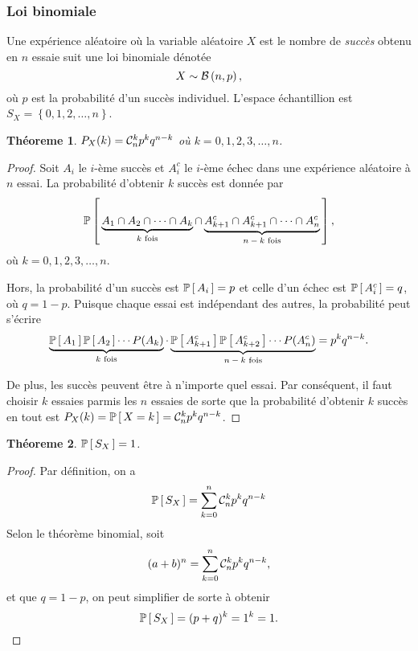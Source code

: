 \documentclass[11pt]{article}
\newcommand\comb[2]{%
	\ensuremath{%
		\mathcal{C}_{#2}^{#1}%
	}%
}%
\renewcommand\P[1]{%
	\ensuremath{%
		\mathbb{P}\left[\,#1\,\right]%
	}%
}%
\newcommand\Bin[2]{%
	\ensuremath{%
		\mathcal{B}\left(#1,#2\right)%
	}%
}%
\newtheorem{theoreme}{Théoreme}[section]
\begin{document}
\subsubsection{Loi binomiale}
Une expérience aléatoire où la variable aléatoire $X$ est le nombre de
\textit{succès} obtenu en $n$ essaie suit une loi binomiale dénotée
\begin{equation*}
	X\sim\Bin{n}{p},
\end{equation*}
où $p$ est la probabilité d'un succès individuel. L'espace échantillion est
$S_X=\left\{0,1,2,\dots,n\right\}$.

\begin{theoreme}
	$P_X(k)=\comb{k}{n}p^kq^{n-k}$ où $k=0,1,2,3,\dots,n$.
\end{theoreme}

\begin{proof}
	Soit $A_i$ le $i$-ème succès et $A_i^c$ le $i$-ème échec dans une
	expérience aléatoire à $n$ essai. La probabilité d'obtenir $k$ succès est
	donnée par
	\begin{equation*}
		\P{
			\underbrace{A_1\cap A_2\cap\cdots\cap A_k}_\text{$k$ fois}
			\cap
			\underbrace{A_{k+1}^c\cap A_{k+1}^c\cap\cdots\cap A_n^c}_
			\text{$n-k$ fois}
		},
	\end{equation*}
	où $k=0,1,2,3,\dots,n$.

	Hors, la probabilité d'un succès est $\P{A_i}=p$ et celle d'un échec est
	$\P{A_i^c}=q$, où $q=1-p$. Puisque chaque essai est indépendant des autres,
	la probabilité peut s'écrire
	\begin{equation*}
		\underbrace{
			\P{A_1}\P{A_2}\cdots P(A_k)
		}_\text{$k$ fois}
		\cdot
		\underbrace{
			\P{A_{k+1}^c}\P{A_{k+2}^c}\cdots P(A_n^c)
		}_\text{$n-k$ fois}
		=p^kq^{n-k}.
	\end{equation*}

	De plus, les succès peuvent être à n'importe quel essai. Par conséquent,
	il faut choisir $k$ essaies parmis les $n$ essaies de sorte que la
	probabilité d'obtenir $k$ succès en tout est
	$P_X(k)=\P{X=k}=\comb{k}{n}p^kq^{n-k}$.
\end{proof}

\begin{theoreme}
	$\P{S_X}=1$.
\end{theoreme}

\begin{proof}
	Par définition, on a
	\begin{equation*}
		\P{S_X}=\sum_{k=0}^n\comb{k}{n}p^kq^{n-k}
	\end{equation*}
	Selon le théorème binomial, soit
	\begin{equation*}
		(a+b)^n=\sum_{k=0}^n\comb{k}{n}p^kq^{n-k},
	\end{equation*}
	et que $q=1-p$, on peut simplifier de sorte à obtenir
	\begin{equation*}
		\P{S_X}=(p+q)^k=1^k=1.\qedhere
	\end{equation*}
\end{proof}
\end{document}
